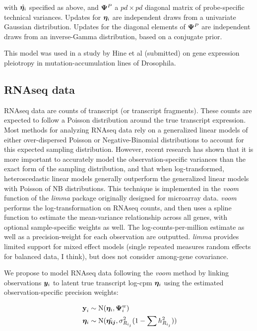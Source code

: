 \documentclass[11pt]{amsart}
\newcommand*{\B}[1]{\ifmmode\bm{#1}\else\textbf{#1}\fi}
\begin{document}
\noindent with $\hat{\B{\eta}_i}$ specified as above, and $\B{\Psi}^P$ a $pd \times pd$ diagonal matrix of probe-specific technical variances. Updates for $\B{\eta}_i$ are independent draws from a univariate Gaussian distribution. Updates for the diagonal elements of $\B{\Psi}^P$ are independent draws from an inverse-Gamma distribution, based on a conjugate prior.

This model was used in a study by Hine et al (submitted) on gene expression pleiotropy in mutation-accumulation lines of Drosophila.

\subsection{RNAseq data}
RNAseq data are counts of transcript (or transcript fragments). These counts are expected to follow a Poisson distribution around the true transcript expression. Most methods for analyzing RNAseq data rely on a generalized linear models of either over-dispersed Poisson or Negative-Binomial distributions to account for this expected sampling distribution. However, recent research has shown that it is more important to accurately model the observation-specific variances than the exact form of the sampling distribution, and that when log-transformed, heteroscedastic linear models generally outperform the generalized linear models with Poisson of NB distributions. This technique is implemented in the \emph{voom} function of the \emph{limma} package originally designed for microarray data. \emph{voom} performs the log-transformation on RNAseq counts, and then uses a spline function to estimate the mean-variance relationship across all genes, with optional sample-specific weights as well. The log-counts-per-million estimate as well as a precision-weight for each observation are outputted. \emph{limma} provides limited support for mixed effect models (single repeated measures random effects for balanced data, I think), but does not consider among-gene covariance.

We propose to model RNAseq data following the \emph{voom} method by linking observations $\B{y}_i$ to latent true transcript log-cpm $\B{\eta}_i$ using the estimated observation-specific precision weights:

\begin{align} \begin{split}
\B{y}_i &\sim \mbox{N}(\B{\eta}_i, \B{\Psi}^w_i) \\
\;\B{\eta}_i &\sim \mbox{N}(\hat{\B{\eta_{ij}}},\sigma^2_{R_{i_j}}(1-\sum h^2_{R_{i_j}}))
\end{split}\end{align}
\end{document}
